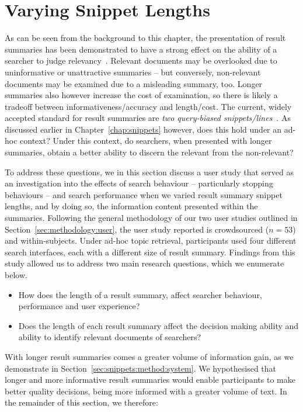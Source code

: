 \section{Varying Snippet Lengths}\label{chap:snippets:user}
As can be seen from the background to this chapter, the presentation of result summaries has been demonstrated to have a strong effect on the ability of a searcher to judge relevancy~\citep{he2012bridging}. Relevant documents may be overlooked due to uninformative or unattractive summaries -- but conversely, non-relevant documents may be examined due to a misleading summary, too. Longer summaries also however increase the cost of examination, so there is likely a tradeoff between informativeness/accuracy and length/cost. The current, widely accepted standard for result summaries are \emph{two query-biased snippets/lines}~\citep{hearst2009_search}. As discussed earlier in Chapter~\ref{chap:snippets} however, does this hold under an ad-hoc context? Under this context, do searchers, when presented with longer summaries, obtain a better ability to discern the relevant from the non-relevant?

To address these questions, we in this section discuss a user study that served as an investigation into the effects of search behaviour -- particularly stopping behaviours -- and search performance when we varied result summary snippet lengths, and by doing so, the information content presented within the summaries. Following the general methodology of our two user studies outlined in Section~\ref{sec:methodology:user}, the user study reported is crowdsourced ($n=53$) and within-subjects. Under ad-hoc topic retrieval, participants used four different search interfaces, each with a different size of result summary. Findings from this study allowed us to address two main research questions, which we enumerate below.

\begin{itemize}
    \item{ How does the length of a result summary, affect searcher behaviour, performance and user experience?}
    \item{ Does the length of each result summary affect the decision making ability and ability to identify relevant documents of searchers?}
\end{itemize}

With longer result summaries comes a greater volume of information gain, as we demonstrate in Section~\ref{sec:snippets:method:system}. We hypothesised that longer and more informative result summaries would enable participants to make better quality decisions, being more informed with a greater volume of text. In the remainder of this section, we therefore:

